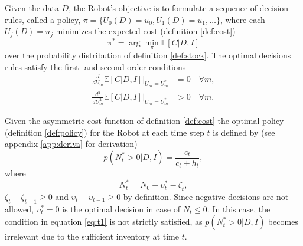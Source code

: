 \begin{definition}
	\label{def:policy}
	Given the data $D$, the Robot’s objective is to formulate a sequence of decision rules, called a policy, $\pi = \{U_0(D)=u_0, U_1(D)=u_1, \dots\}$, where each $U_j(D) = u_j$ minimizes the expected cost (definition \ref{def:cost})
	\begin{equation}
		\pi^* = \arg \min_{\pi} \mathbb{E}[C| D, I]
	\end{equation}
	over the probability distribution of definition \ref{def:stock}. The optimal decisions rules satisfy the first- and second-order conditions
	\begin{equation}
		\begin{split}
			\frac{d}{dU_m} \mathbb{E}[C | D, I] \Big|_{U_m = U_m^*} &= 0 \quad \forall m,\\
			\frac{d^2}{dU_m^2} \mathbb{E}[C | D, I] \Big|_{U_m = U_m^*} & > 0 \quad \forall m.
		\end{split}
		\label{eq:conditions}
	\end{equation}
\end{definition}

\begin{theorem}
	\label{theorem:opt_policy}
	Given the asymmetric cost function of definition \ref{def:cost} the optimal policy (definition \ref{def:policy}) for the Robot at each time step $t$ is defined by (see appendix \ref{app:deriva} for derivation)
	\begin{equation}
		p(N_t^* > 0 | D, I) = \frac{c_t}{c_t + h_t},
		\label{eq:t1}
	\end{equation}
	where
	\begin{equation}
		N_t^* = N_0 +\upsilon_t^*-\zeta_t,
	\end{equation}
	$\zeta_t-\zeta_{t-1}\geq 0$ and $\upsilon_t-\upsilon_{t-1}\geq 0$ by definition. Since negative decisions are not allowed, $\upsilon_t^* = 0$ is the optimal decision in case of $N_t\leq 0$. In this case, the condition in equation \eqref{eq:t1} is not strictly satisfied, as $p(N_t^* > 0 | D, I)$ becomes irrelevant due to the sufficient inventory at time $t$.
\end{theorem}